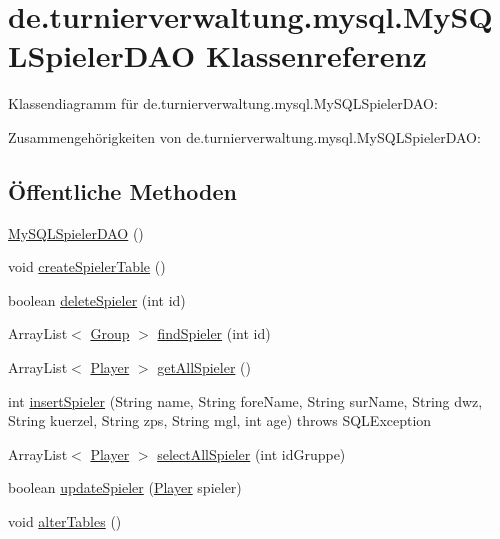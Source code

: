 \hypertarget{classde_1_1turnierverwaltung_1_1mysql_1_1_my_s_q_l_spieler_d_a_o}{}\section{de.\+turnierverwaltung.\+mysql.\+My\+S\+Q\+L\+Spieler\+D\+AO Klassenreferenz}
\label{classde_1_1turnierverwaltung_1_1mysql_1_1_my_s_q_l_spieler_d_a_o}


Klassendiagramm für de.\+turnierverwaltung.\+mysql.\+My\+S\+Q\+L\+Spieler\+D\+AO\+:


Zusammengehörigkeiten von de.\+turnierverwaltung.\+mysql.\+My\+S\+Q\+L\+Spieler\+D\+AO\+:
\subsection*{Öffentliche Methoden}
\begin{DoxyCompactItemize}
\item 
\hyperlink{classde_1_1turnierverwaltung_1_1mysql_1_1_my_s_q_l_spieler_d_a_o_a6232fbf7edf53052b1cbc64fc1a9bf06}{My\+S\+Q\+L\+Spieler\+D\+AO} ()
\item 
void \hyperlink{classde_1_1turnierverwaltung_1_1mysql_1_1_my_s_q_l_spieler_d_a_o_ae41547faae8f4a76ff29605a6aafaaf9}{create\+Spieler\+Table} ()
\item 
boolean \hyperlink{classde_1_1turnierverwaltung_1_1mysql_1_1_my_s_q_l_spieler_d_a_o_a84bbc6dc7f7ec4811d70b4d050f99626}{delete\+Spieler} (int id)
\item 
Array\+List$<$ \hyperlink{classde_1_1turnierverwaltung_1_1model_1_1_group}{Group} $>$ \hyperlink{classde_1_1turnierverwaltung_1_1mysql_1_1_my_s_q_l_spieler_d_a_o_aedd6c2e80fda6d81e891fee6ce95bf03}{find\+Spieler} (int id)
\item 
Array\+List$<$ \hyperlink{classde_1_1turnierverwaltung_1_1model_1_1_player}{Player} $>$ \hyperlink{classde_1_1turnierverwaltung_1_1mysql_1_1_my_s_q_l_spieler_d_a_o_aa7385903f4634bbfb69912a7b52fce7d}{get\+All\+Spieler} ()
\item 
int \hyperlink{classde_1_1turnierverwaltung_1_1mysql_1_1_my_s_q_l_spieler_d_a_o_ac4c749567299aa709cafad213bacb9a6}{insert\+Spieler} (String name, String fore\+Name, String sur\+Name, String dwz, String kuerzel, String zps, String mgl, int age)  throws S\+Q\+L\+Exception 
\item 
Array\+List$<$ \hyperlink{classde_1_1turnierverwaltung_1_1model_1_1_player}{Player} $>$ \hyperlink{classde_1_1turnierverwaltung_1_1mysql_1_1_my_s_q_l_spieler_d_a_o_a2d19ade696d4f9d4df53fa006d83745d}{select\+All\+Spieler} (int id\+Gruppe)
\item 
boolean \hyperlink{classde_1_1turnierverwaltung_1_1mysql_1_1_my_s_q_l_spieler_d_a_o_ab7a57042d57cb2931e3a57ae79ed4c15}{update\+Spieler} (\hyperlink{classde_1_1turnierverwaltung_1_1model_1_1_player}{Player} spieler)
\item 
void \hyperlink{classde_1_1turnierverwaltung_1_1mysql_1_1_my_s_q_l_spieler_d_a_o_af39adffdbb607d6d76b70a6c78fe69a7}{alter\+Tables} ()
\end{DoxyCompactItemize}


